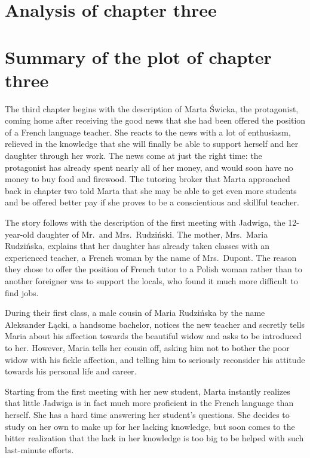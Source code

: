 \section{Analysis of chapter three}
\section{Summary of the plot of chapter three}

The third chapter begins with the description of Marta Świcka, the protagonist, coming home after receiving the good news that she had been offered the position of a French language teacher.
She reacts to the news with a lot of enthusiasm, relieved in the knowledge that she will finally be able to support herself and her daughter through her work.
The news come at just the right time: the protagonist has already spent nearly all of her money, and would soon have no money to buy food and firewood.
The tutoring broker that Marta approached back in chapter two told Marta that she may be able to get even more students and be offered better pay if she proves to be a conscientious and skillful teacher.

The story follows with the description of the first meeting with Jadwiga, the 12-year-old daughter of Mr.\ and Mrs.\ Rudziński.
The mother, Mrs.\ Maria Rudzińska, explains that her daughter has already taken classes with an experienced teacher, a French woman by the name of Mrs.\ Dupont.
The reason they chose to offer the position of French tutor to a Polish woman rather than to another foreigner was to support the locals, who found it much more difficult to find jobs.

During their first class, a male cousin of Maria Rudzińska by the name Aleksander Łącki, a handsome bachelor, notices the new teacher and secretly tells Maria about his affection towards the beautiful widow and asks to be introduced to her.
However, Maria tells her cousin off, asking him not to bother the poor widow with his fickle affection, and telling him to seriously reconsider his attitude towards his personal life and career.

Starting from the first meeting with her new student, Marta instantly realizes that little Jadwiga is in fact much more proficient in the French language than herself.
She has a hard time answering her student's questions.
She decides to study on her own to make up for her lacking knowledge, but soon comes to the bitter realization that the lack in her knowledge is too big to be helped with such last-minute efforts.

